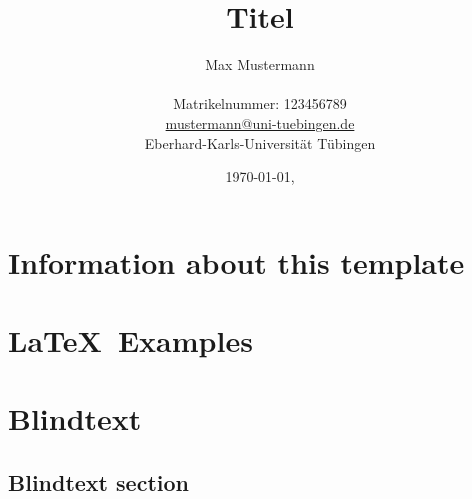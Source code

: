 \documentclass[
11pt,
bibliography=totoc,
numbers=noenddot,
]{scrbook}
\title{Titel}
\author{{\LARGE Max Mustermann} \\
		\\
		Matrikelnummer: 123456789\\
		\url{mustermann@uni-tuebingen.de}\\ 
		Eberhard-Karls-Universität Tübingen\\}
\date{\ddmmyyyydate\today, \currenttime}
\begin{document}
\maketitle
\frontmatter
\tableofcontents
\mainmatter 

\chapter{Information about this template}



\chapter{\LaTeX\ Examples}



\chapter{Blindtext}

\lipsum

\section{Blindtext section}

\lipsum


\insertBib
\end{document}
